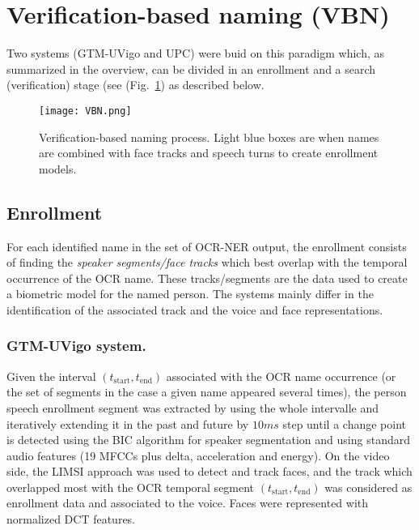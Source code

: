 \section{Verification-based naming (VBN)}
\label{sec:verification}

Two systems (GTM-UVigo and UPC) were buid on this paradigm which, 
as summarized in the overview, can be divided in an enrollment and a 
search (verification) stage (see (Fig.~\ref{fig:vbn}) 
as described below.

\begin{figure}[tb]
 \centering
 \texttt{[image: VBN.png]}
\vspace*{-7mm}
 \caption{Verification-based naming process. Light blue boxes are when names are combined with face tracks and speech turns to create enrollment models.}
\vspace*{-3mm}
 \label{fig:vbn}
\end{figure}

\subsection{Enrollment}


For each identified name in the set of OCR-NER output, the enrollment consists of finding the  \textit{speaker segments/face tracks} 
which best overlap with the temporal occurrence of the OCR name. 
These tracks/segments are the data used to create a biometric model for the named person. 
%
The systems mainly differ in the identification of the associated track and the voice and face  representations.


\subsubsection{GTM-UVigo system.}
%
Given the interval  $(t_{\mathrm{start}},t_{\mathrm{end}})$ associated with the OCR name occurrence (or the set 
of segments in the case a given name appeared several times), the person speech enrollment segment was extracted by 
using the whole intervalle and iteratively  extending it in the past and future  by $10ms$ step until a change point 
is detected using the BIC algorithm for speaker segmentation and using standard audio features (19 MFCCs plus delta, acceleration and energy).
%
On the video side, the LIMSI approach was used to detect and track faces, and the track which overlapped most with the OCR temporal 
segment  $(t_{\mathrm{start}},t_{\mathrm{end}})$ was considered as enrollment data and associated to the voice.
Faces were represented with normalized DCT features.

